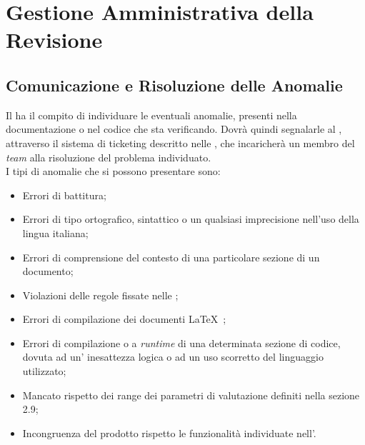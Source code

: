 \newpage
\section{Gestione Amministrativa della Revisione}

\subsection{Comunicazione e Risoluzione delle Anomalie}
Il \textit{\Ver} ha il compito di individuare le eventuali anomalie, presenti nella documentazione o nel codice che sta verificando. Dovrà quindi segnalarle al \textit{\RdP}, attraverso il sistema di ticketing descritto nelle \textit{\NdP}, che incaricherà un membro del \textit{team} alla risoluzione del problema individuato.\\ 
I tipi di anomalie che si possono presentare sono:
\begin{itemize} 
\item Errori di battitura;
\item Errori di tipo ortografico, sintattico o un qualsiasi imprecisione nell'uso della lingua italiana; 
\item Errori di comprensione del contesto di una particolare sezione di un documento;
\item Violazioni delle regole fissate nelle \textit{\NdP};
\item Errori di compilazione dei documenti \LaTeX~;
\item Errori di compilazione o a \textit{runtime} di una determinata sezione di codice, dovuta ad un' inesattezza logica o ad un uso scorretto del linguaggio utilizzato; 
\item Mancato rispetto dei range dei parametri di valutazione definiti nella sezione 2.9;
\item Incongruenza del prodotto rispetto le funzionalità individuate nell’\textit{\AdR}.
\end{itemize}
